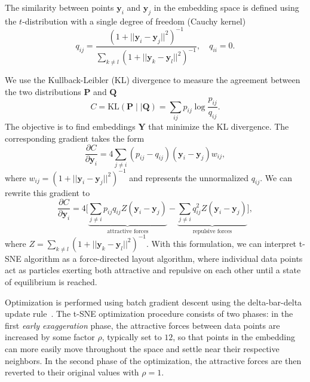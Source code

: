 \documentclass[article]{jss}
\begin{document}
The similarity between points $\mathbf{y}_i$ and $\mathbf{y}_j$ in the embedding
space is defined using the $t$-distribution with a single degree of freedom
(Cauchy kernel)
\begin{equation}
q_{ij} = \frac{\left ( 1 + || \mathbf{y}_i - \mathbf{y}_j ||^2 \right )^{-1}}
{\sum_{k \neq l}\left ( 1 + || \mathbf{y}_k - \mathbf{y}_l ||^2 \right )^{-1}},
\quad q_{ii} = 0.
\label{eq:cauchy_kernel}
\end{equation}

We use the Kullback-Leibler (KL) divergence to measure the agreement
between the two distributions $\mathbf{P}$ and $\mathbf{Q}$
\begin{equation}
C = \text{KL}(\mathbf{P} \mid \mid \mathbf{Q}) = \sum_{ij} p_{ij} \log \frac{p_{ij}}{q_{ij}}.
\label{eq:kl_divergence}
\end{equation}
The objective is to find embeddings $\mathbf{Y}$ that minimize the KL divergence. The corresponding gradient takes the form
\begin{equation}
\frac{\partial C}{\partial \mathbf{y}_i} = 4 \sum_{j \neq i} \left ( p_{ij} - q_{ij} \right ) \left ( \mathbf{y}_i - \mathbf{y}_j \right ) w_{ij},
\label{eq:tsne_gradient}
\end{equation}
where $w_{ij} = \left ( 1 + || \mathbf{y}_i - \mathbf{y}_j || ^2 \right )^{-1}$
and represents the unnormalized $q_{ij}$.
We can rewrite this gradient to
\begin{equation}
\frac{\partial C}{\partial \mathbf{y}_i} = 4 \Bigg [
\underbrace{\sum_{j \neq i} p_{ij} q_{ij} Z \left ( \mathbf{y}_i - \mathbf{y}_j \right )}_{\text{attractive forces}}  -
\underbrace{\sum_{j \neq i} q_{ij}^2 Z \left ( \mathbf{y}_i - \mathbf{y}_j \right )}_{\text{repulsive forces}}
\Bigg ], \label{eq:grad_attr_rep}
\end{equation}
where $Z = \sum_{k \neq l}\left ( 1 + || \mathbf{y}_k - \mathbf{y}_l ||^2 \right )^{-1}$. With this formulation, we can interpret t-SNE algorithm as a force-directed layout algorithm, where individual data points act as particles exerting both attractive and repulsive on each other until a state of equilibrium is reached.

Optimization is performed using batch gradient descent using the delta-bar-delta update rule~\citep{jacobs1988increased}. The t-SNE optimization procedure consists of two phases: in the first \textit{early exaggeration} phase, the attractive forces between data points are increased by some factor $\rho$, typically set to $12$, so that points in the embedding can more easily move throughout the space and settle near their respective neighbors. In the second phase of the optimization, the attractive forces are then reverted to their original values with $\rho=1$.
\end{document}
